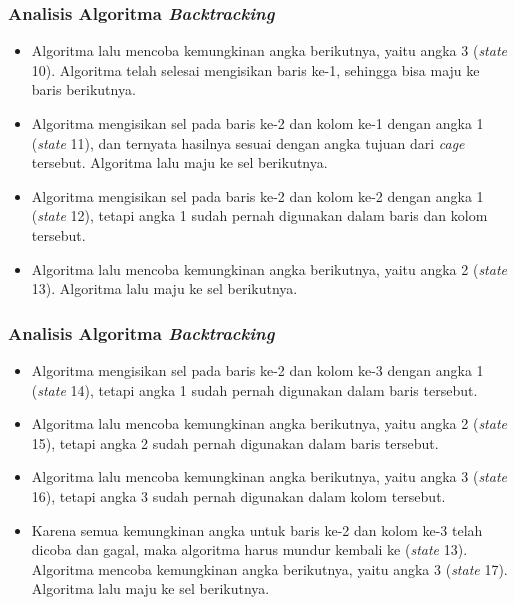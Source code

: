 \documentclass{beamer}
\begin{document}
\begin{frame}
\frametitle{Analisis Algoritma \textit{Backtracking}}
\begin{itemize}
\item Algoritma lalu mencoba kemungkinan angka berikutnya, yaitu angka 3 (\textit{state} 10). Algoritma telah selesai mengisikan baris ke-1, sehingga bisa maju ke baris berikutnya.
\item Algoritma mengisikan sel pada baris ke-2 dan kolom ke-1 dengan angka 1 (\textit{state} 11), dan ternyata hasilnya sesuai dengan angka tujuan dari \textit{cage} tersebut. Algoritma lalu maju ke sel berikutnya.
\item Algoritma mengisikan sel pada baris ke-2 dan kolom ke-2 dengan angka 1 (\textit{state} 12), tetapi angka 1 sudah pernah digunakan dalam baris dan kolom tersebut.
\item Algoritma lalu mencoba kemungkinan angka berikutnya, yaitu angka 2 (\textit{state} 13). Algoritma lalu maju ke sel berikutnya.
\end{itemize}
\end{frame}


\begin{frame}
\frametitle{Analisis Algoritma \textit{Backtracking}}
\begin{itemize}
\item Algoritma mengisikan sel pada baris ke-2 dan kolom ke-3 dengan angka 1 (\textit{state} 14), tetapi angka 1 sudah pernah digunakan dalam baris tersebut. 
\item Algoritma lalu mencoba kemungkinan angka berikutnya, yaitu angka 2 (\textit{state} 15), tetapi angka 2 sudah pernah digunakan dalam baris tersebut.
\item Algoritma lalu mencoba kemungkinan angka berikutnya, yaitu angka 3 (\textit{state} 16), tetapi angka 3 sudah pernah digunakan dalam kolom tersebut.
\item Karena semua kemungkinan angka untuk baris ke-2 dan kolom ke-3 telah dicoba dan gagal, maka algoritma harus mundur kembali ke (\textit{state} 13). Algoritma mencoba kemungkinan angka berikutnya, yaitu angka 3 (\textit{state} 17). Algoritma lalu maju ke sel berikutnya.
\end{itemize}
\end{frame}
\end{document}
